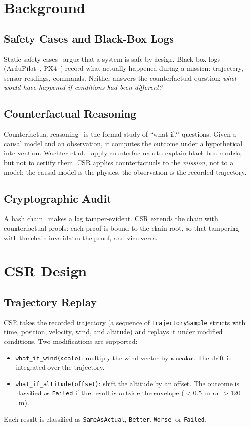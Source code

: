 ﻿\section{Background}

\subsection{Safety Cases and Black-Box Logs}
Static safety cases~\cite{kelly1998,easa_sc_vtol} argue that a
system is safe by design. Black-box logs (ArduPilot~\cite{ardupilot},
PX4~\cite{px4}) record what actually happened during a mission:
trajectory, sensor readings, commands. Neither answers the
counterfactual question: \emph{what would have happened if conditions
had been different?}

\subsection{Counterfactual Reasoning}
Counterfactual reasoning~\cite{pearl2009,lewis1973} is the formal
study of ``what if?' questions. Given a causal model and an
observation, it computes the outcome under a hypothetical
intervention. Wachter et al.~\cite{wachter2017} apply
counterfactuals to explain black-box models, but not to certify
them. CSR applies counterfactuals to the \emph{mission}, not to a
model: the causal model is the physics, the observation is the
recorded trajectory.

\subsection{Cryptographic Audit}
A hash chain~\cite{crosby2009,merkle1988} makes a log
tamper-evident. CSR extends the chain with counterfactual proofs:
each proof is bound to the chain root, so that tampering with the
chain invalidates the proof, and vice versa.

\section{CSR Design}

\subsection{Trajectory Replay}
CSR takes the recorded trajectory (a sequence of
\texttt{TrajectorySample} structs with time, position, velocity,
wind, and altitude) and replays it under modified conditions. Two
modifications are supported:
\begin{itemize}
    \item \texttt{what\_if\_wind(scale)}: multiply the wind vector
          by a scalar. The drift is integrated over the trajectory.
    \item \texttt{what\_if\_altitude(offset)}: shift the altitude
          by an offset. The outcome is classified as
          \texttt{Failed} if the result is outside the envelope
          ($<0.5$~m or $>120$~m).
\end{itemize}
Each result is classified as \texttt{SameAsActual}, \texttt{Better},
\texttt{Worse}, or \texttt{Failed}.

